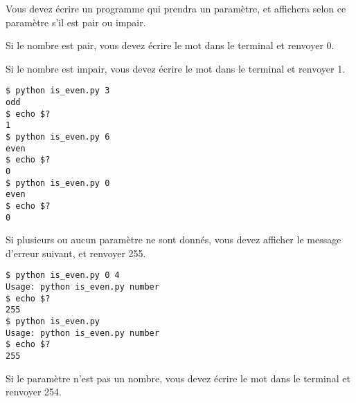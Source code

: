 

%
%

\vspace{0.7cm}

\noindent {}

\bigskip

\noindent Vous devez écrire un programme qui prendra un paramètre, et affichera selon ce paramètre s'il est pair ou impair.

\noindent Si le nombre est pair, vous devez écrire le mot  dans le terminal et renvoyer 0.

\noindent Si le nombre est impair, vous devez écrire le mot  dans le terminal et renvoyer 1.

\bigskip

\lstset{language=sh}
\begin{lstlisting}[frame=single,title={Cas général}]
$ python is_even.py 3
odd
$ echo $?
1
$ python is_even.py 6
even
$ echo $?
0
$ python is_even.py 0
even
$ echo $?
0
\end{lstlisting}

\bigskip

\noindent Si plusieurs ou aucun paramètre ne sont donnés, vous devez afficher le message d'erreur suivant, et renvoyer 255.

\bigskip

\noindent {}

\bigskip

\lstset{language=sh}
\begin{lstlisting}[frame=single,title={Cas d'erreur 1}]
$ python is_even.py 0 4
Usage: python is_even.py number
$ echo $?
255
$ python is_even.py
Usage: python is_even.py number
$ echo $?
255
\end{lstlisting}

\bigskip

\noindent Si le paramètre n'est pas un nombre, vous devez écrire le mot  dans le terminal et renvoyer 254.

